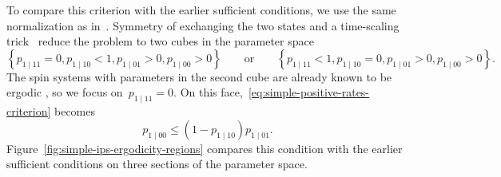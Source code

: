 \documentclass[EJP,preprint,NODS,nobera]{ejpecp}
\newcommand{\cb}[1]{\left\{#1\right\}}
\begin{document}
To compare this criterion with the earlier sufficient conditions, we use the
same normalization as in~\cite{GluchowskiMenz2025}. Symmetry of exchanging the two states and a time-scaling trick~\cite{GluchowskiMenz2025} reduce the problem to two cubes in the parameter space
\begin{equation*}
\cb{p_{1\mid11}=0, p_{1\mid 10}<1, p_{1\mid 01}>0, p_{1\mid 00}>0}
\qquad\text{or}\qquad
\cb{p_{1\mid11}<1, p_{1\mid 10}=0, p_{1\mid 01}>0, p_{1\mid 00}>0}.
\end{equation*}
The spin systems with parameters in the second cube are already known to be ergodic
\cite[Section~7]{GluchowskiMenz2025}, so we focus on~$p_{1\mid11}=0$. On this
face,~\eqref{eq:simple-positive-rates-criterion} becomes
\begin{equation}
\label{eq:simple-positive-rates-face}
p_{1\mid00}
\leq
(1-p_{1\mid10})p_{1\mid01}.
\end{equation}
Figure~\ref{fig:simple-ips-ergodicity-regions} compares this condition with
the earlier sufficient conditions on three sections of the parameter space.
\end{document}
